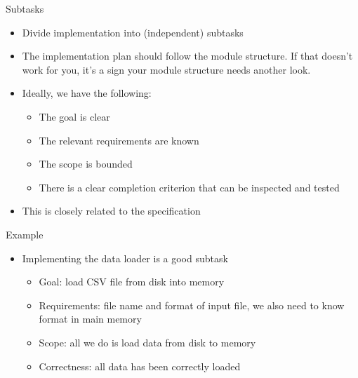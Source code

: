 \documentclass[
ps,
]{prosper}
\begin{document}
\begin{slide}{Subtasks}

\begin{itemize}

\item Divide implementation into (independent) subtasks

\item The implementation plan should follow the module structure. If that doesn't work for you, it's a sign your module structure needs another look.
  
\item Ideally, we have the following:

  \begin{itemize}
    
  \item The goal is clear

  \item The relevant requirements are known
    
  \item The scope is bounded

  \item There is a clear completion criterion that can be inspected and tested
    
  \end{itemize}

\item This is closely related to the specification
  
\end{itemize}
  
\end{slide}





\begin{slide}{Example}

\begin{itemize}

\item Implementing the data loader is a good subtask

  \begin{itemize}
    
  \item Goal: load CSV file from disk into memory 

  \item Requirements: file name and format of input file, we also need
    to know format in main memory

  \item Scope: all we do is load data from disk to memory

  \item Correctness: all data has been correctly loaded
    
  \end{itemize}

\end{itemize}
  
\end{slide}
\end{document}
